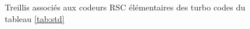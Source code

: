 \begin{figure}[h!]
\begin{center}
		\caption{Treillis associés aux codeurs RSC élémentaires des turbo codes du tableau \ref{tab:std}}
		\label{fig:treillisstd}
	\end{center}
\end{figure}

% 			
% 			
																																																																																																																																										

